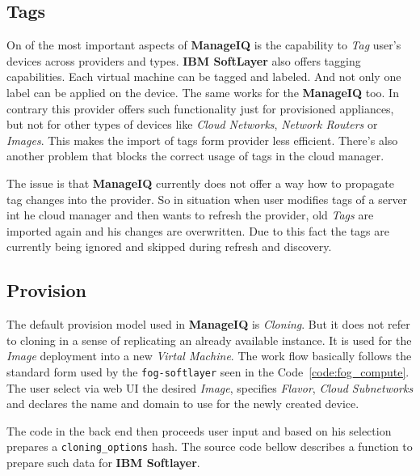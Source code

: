 \subsection{Tags}
\label{sub:Tags}

On of the most important aspects of \textbf{ManageIQ} is the capability to \emph{Tag} user's devices across providers and types. \textbf{IBM SoftLayer} also offers tagging capabilities. Each virtual machine can be tagged and labeled. And not only one label can be applied on the device. The same works for the \textbf{ManageIQ} too. In contrary this provider offers such functionality just for provisioned appliances, but not for other types of devices like \emph{Cloud Networks}, \emph{Network Routers} or \emph{Images}. This makes the import of tags form provider less efficient. There's also another problem that blocks the correct usage of tags in the cloud manager.

The issue is that \textbf{ManageIQ} currently does not offer a way how to propagate tag changes into the provider. So in situation when user modifies tags of a server int he cloud manager and then wants to refresh the provider, old \emph{Tags} are imported again and his changes are overwritten. Due to this fact the tags are currently being ignored and skipped during refresh and discovery.

\clearpage
\subsection{Provision}
\label{sub:Provision}

The default provision model used in \textbf{ManageIQ} is \emph{Cloning}. But it does not refer to cloning in a sense of replicating an already available instance. It is used for the \emph{Image} deployment into a new \emph{Virtal Machine}.
The work flow basically follows the standard form used by the \texttt{fog-softlayer} seen in the Code~\ref{code:fog_compute}. The user select via web UI the desired \emph{Image}, specifies \emph{Flavor}, \emph{Cloud Subnetworks} and declares the name and domain to use for the newly created device.

The code in the back end then proceeds user input and based on his selection prepares a \verb|cloning_options| hash. The source code bellow describes a function to prepare such data for \textbf{IBM Softlayer}.

